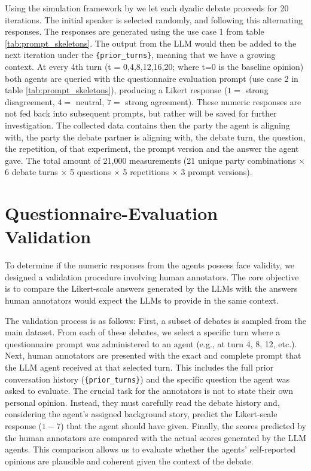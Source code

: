Using the simulation framework by \cite{neuberger2024sauce} we let each dyadic debate proceeds for 20 iterations. The initial speaker is selected randomly, and following this alternating responses. The responses are generated using the use case 1 from table \ref{tab:prompt_skeletons}. The output from the LLM would then be added to the next iteration under the \texttt{\{prior\_turns\}}, meaning that we have a growing context. At every 4th turn (t = 0,4,8,12,16,20; where t=0 is the baseline opinion) both agents are queried with the questionnaire evaluation prompt (use case 2 in table \ref{tab:prompt_skeletons}), producing a Likert response (\(1=\) strong disagreement, \(4=\) neutral, \(7=\) strong agreement). These numeric responses are not fed back into subsequent prompts, but rather will be saved for further investigation. The collected data contains then the party the agent is aligning with, the party the debate partner is aligning with, the debate turn, the question, the repetition, of that experiment, the prompt version and the answer the agent gave. The total amount of 21,000 measurements (21 unique party combinations $\times$ 6 debate turns $\times$ 5 questions $\times$ 5 repetitions $\times$ 3 prompt versions).


\section{Questionnaire-Evaluation Validation}
\label{sec:questionnaire_validation}

To determine if the numeric responses from the agents possess face validity, we designed a validation procedure involving human annotators. The core objective is to compare the Likert-scale answers generated by the LLMs with the answers human annotators would expect the LLMs to provide in the same context.

The validation process is as follows:
First, a subset of debates is sampled from the main dataset. From each of these debates, we select a specific turn where a questionnaire prompt was administered to an agent (e.g., at turn 4, 8, 12, etc.). Next, human annotators are presented with the exact and complete prompt that the LLM agent received at that selected turn. This includes the full prior conversation history (\texttt{\{prior\_turns\}}) and the specific question the agent was asked to evaluate. The crucial task for the annotators is not to state their own personal opinion. Instead, they must carefully read the debate history and, considering the agent's assigned background story, predict the Likert-scale response ($1-7$) that the agent should have given. Finally, the scores predicted by the human annotators are compared with the actual scores generated by the LLM agents. This comparison allows us to evaluate whether the agents' self-reported opinions are plausible and coherent given the context of the debate.

